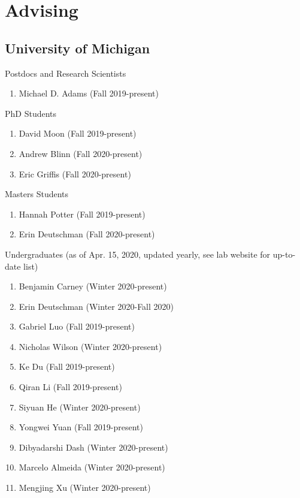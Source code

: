 \documentclass[10pt,letterpaper]{article}
\renewenvironment{itemize}{
  \begin{list}{}{
    \setlength{\leftmargin}{1.25em}
    \setlength{\itemsep}{0.25em}
    \setlength{\parskip}{0pt}
    \setlength{\parsep}{0.2em}
  }
}{
  \end{list}
}
\begin{document}
\section*{Advising}

\subsection*{University of Michigan}
\begin{itemize}
\item Postdocs and Research Scientists
  \begin{enumerate}
    \item Michael D. Adams (Fall 2019-present)
  \end{enumerate}
\item PhD Students
  \begin{enumerate}
    \item David Moon (Fall 2019-present)
    \item Andrew Blinn (Fall 2020-present)
    \item Eric Griffis (Fall 2020-present)
  \end{enumerate}
\item Masters Students
  \begin{enumerate}
    \item Hannah Potter (Fall 2019-present)
    \item Erin Deutschman (Fall 2020-present)
  \end{enumerate}
\item Undergraduates (as of Apr. 15, 2020, updated yearly, see lab website for up-to-date list)
  \begin{enumerate}
    \item Benjamin Carney (Winter 2020-present)
    \item Erin Deutschman (Winter 2020-Fall 2020)
    \item Gabriel Luo (Fall 2019-present)
    \item Nicholas Wilson (Winter 2020-present)
    \item Ke Du (Fall 2019-present)
    \item Qiran Li (Fall 2019-present)
    \item Siyuan He (Winter 2020-present)
    \item Yongwei Yuan (Fall 2019-present)
    \item Dibyadarshi Dash (Winter 2020-present)
    \item Marcelo Almeida (Winter 2020-present)
    \item Mengjing Xu (Winter 2020-present)

\end{enumerate}
\end{itemize}
\end{document}
